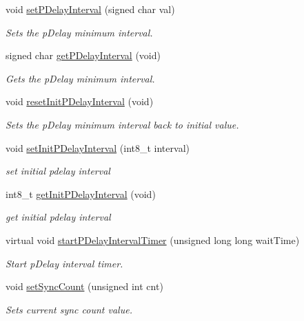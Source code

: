 \begin{DoxyCompactItemize}
void \hyperlink{class_common_port_aeccea93c15d4e8ce00dd87a20227a8bb}{set\+P\+Delay\+Interval} (signed char val)
\begin{DoxyCompactList}\small\item\em Sets the p\+Delay minimum interval. \end{DoxyCompactList}\item 
signed char \hyperlink{class_common_port_a6b594b958b0887ec332bfb61bc5981c4}{get\+P\+Delay\+Interval} (void)
\begin{DoxyCompactList}\small\item\em Gets the p\+Delay minimum interval. \end{DoxyCompactList}\item 
void \hyperlink{class_common_port_a581ecd601f511bc0e7378f12ff690c63}{reset\+Init\+P\+Delay\+Interval} (void)
\begin{DoxyCompactList}\small\item\em Sets the p\+Delay minimum interval back to initial value. \end{DoxyCompactList}\item 
void \hyperlink{class_common_port_ae85afbc79e2236958fd975d9bd55d61e}{set\+Init\+P\+Delay\+Interval} (int8\+\_\+t interval)
\begin{DoxyCompactList}\small\item\em set initial pdelay interval \end{DoxyCompactList}\item 
int8\+\_\+t \hyperlink{class_common_port_ad2164f9dd75bd80b8e8dd7456f6c5dc3}{get\+Init\+P\+Delay\+Interval} (void)
\begin{DoxyCompactList}\small\item\em get initial pdelay interval \end{DoxyCompactList}\item 
virtual void \hyperlink{class_common_port_a6fb0ad2d83f335ad766394adfd52e930}{start\+P\+Delay\+Interval\+Timer} (unsigned long long wait\+Time)
\begin{DoxyCompactList}\small\item\em Start p\+Delay interval timer. \end{DoxyCompactList}\item 
void \hyperlink{class_common_port_af6ea2ac59598ee23d3886aa4a98ad4ab}{set\+Sync\+Count} (unsigned int cnt)
\begin{DoxyCompactList}\small\item\em Sets current sync count value. \end{DoxyCompactList}\item 

\end{DoxyCompactItemize}
